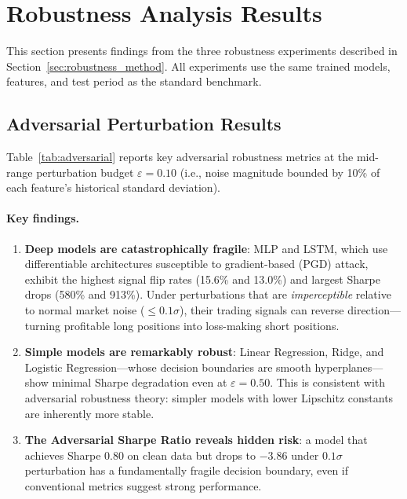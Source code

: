 \documentclass[preprint,review,12pt]{elsarticle}
\begin{document}
\section{Robustness Analysis Results}
\label{sec:robustness_results}

This section presents findings from the three robustness experiments described in Section~\ref{sec:robustness_method}.
All experiments use the same trained models, features, and test period as the standard benchmark.

\subsection{Adversarial Perturbation Results}
\label{sec:adv_results}

Table~\ref{tab:adversarial} reports key adversarial robustness metrics at the mid-range perturbation budget $\varepsilon = 0.10$ (i.e., noise magnitude bounded by 10\% of each feature's historical standard deviation).

\begin{table}[H]
\centering
\caption{Adversarial robustness at $\varepsilon = 0.10\sigma$.
Signal Flip Rate = fraction of trading signals that change sign; Rank Corr.\ = Spearman correlation between clean and adversarial prediction rankings; Sharpe Drop = relative Sharpe degradation.
Models sorted by vulnerability (highest Sharpe drop first).}
\label{tab:adversarial}
\footnotesize

\end{table}

\paragraph{Key findings.}
\begin{enumerate}[leftmargin=1.6em]
  \item \textbf{Deep models are catastrophically fragile}: MLP and LSTM, which use differentiable architectures susceptible to gradient-based (PGD) attack, exhibit the highest signal flip rates (15.6\% and 13.0\%) and largest Sharpe drops (580\% and 913\%). Under perturbations that are \emph{imperceptible} relative to normal market noise ($\leq 0.1\sigma$), their trading signals can reverse direction---turning profitable long positions into loss-making short positions.
  
  \item \textbf{Simple models are remarkably robust}: Linear Regression, Ridge, and Logistic Regression---whose decision boundaries are smooth hyperplanes---show minimal Sharpe degradation even at $\varepsilon = 0.50$. This is consistent with adversarial robustness theory: simpler models with lower Lipschitz constants are inherently more stable.
  
  \item \textbf{The Adversarial Sharpe Ratio reveals hidden risk}: a model that achieves Sharpe 0.80 on clean data but drops to $-3.86$ under $0.1\sigma$ perturbation has a fundamentally fragile decision boundary, even if conventional metrics suggest strong performance.
\end{enumerate}
\end{document}
